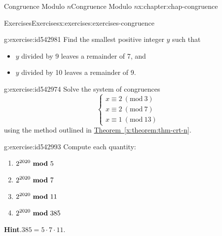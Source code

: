\documentclass[oneside,10pt,]{book}
\newcommand{\blocktitlefont}{\relax}
\newcommand{\xreffont}{\relax}
\numberwithin{equation}{section}
\newcommand{\Mod}[1]{\ \left(\mathrm{mod}\ #1\right)}
\newcommand{\mmod}[1]{\ \mathrm{\bf mod}\ #1}
\begin{document}
\begin{chapterptx}{Congruence Modulo \(n\)}{}{Congruence Modulo \(n\)}{}{}{x:chapter:chap-congruence}
\begin{exercises-section}{Exercises}{}{Exercises}{}{}{x:exercises:exercises-congruence}
\begin{divisionexercise}{18}{}{}{g:exercise:id542981}%
Find the smallest positive integer \(y\) such that%
\begin{itemize}[label=\textbullet]
\item{}\(y\) divided by 9 leaves a remainder of 7, and%
\item{}\(y\) divided by 10 leaves a remainder of 9.%
\end{itemize}
%
\end{divisionexercise}%
\begin{divisionexercise}{19}{}{}{g:exercise:id542974}%
Solve the system of congruences%
\begin{equation*}
\begin{cases} x \equiv 2 \Mod{3} \\
x \equiv 2 \Mod{7} \\
x \equiv 1 \Mod{13} \end{cases}
\end{equation*}
using the method outlined in \hyperref[x:theorem:thm-crt-n]{Theorem~{\xreffont\ref{x:theorem:thm-crt-n}}}.%
\end{divisionexercise}%
\begin{divisionexercise}{20}{}{}{g:exercise:id542993}%
Compute each quantity:%
\begin{enumerate}[label=(\alph*)]
\item{}\(\displaystyle 2^{2020} \mmod{5}\)%
\item{}\(\displaystyle 2^{2020} \mmod{7}\)%
\item{}\(\displaystyle 2^{2020} \mmod{11}\)%
\item{}\(\displaystyle 2^{2020} \mmod{385}\)%
\end{enumerate}
%
\par\smallskip%
\noindent\textbf{\blocktitlefont Hint}.\hypertarget{g:hint:id543002}{}\quad{}\(385 = 5 \cdot 7 \cdot 11\).%
\end{divisionexercise}%
\end{exercises-section}
\end{chapterptx}
%
%
\typeout{************************************************}
\typeout{************************************************}
%
\end{document}

